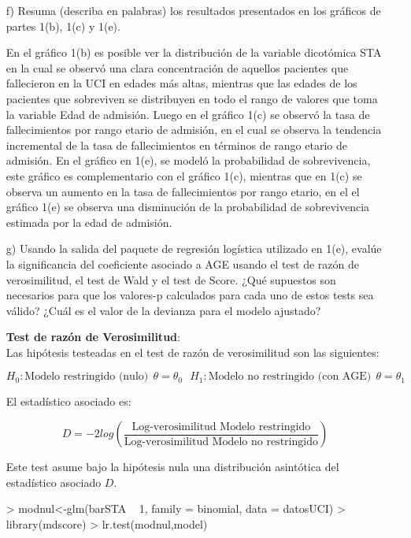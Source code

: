 \documentclass[11pt,onside]{article}
\begin{document}
\begin{itemize}
\item[f)] Resuma (describa en palabras) los resultados presentados en los gráficos de partes 1(b), 1(c) y 1(e).

En el gráfico 1(b) es posible ver la distribución de la variable dicotómica STA en la cual se observó una clara concentración de aquellos pacientes que fallecieron en la UCI en edades más altas, mientras que las edades de los pacientes que sobreviven se distribuyen en todo el rango de valores que toma la variable Edad de admisión. Luego en el gráfico 1(c) se observó la tasa de fallecimientos por rango etario de admisión, en el cual se observa la tendencia incremental de la tasa de fallecimientos en términos de rango etario de admisión. En el gráfico en 1(e), se modeló la probabilidad de sobrevivencia, este gráfico es complementario con el gráfico 1(c), mientras que en 1(c) se observa un aumento en la tasa de fallecimientos por rango etario, en el el gráfico 1(e) se observa una disminución de la probabilidad de sobrevivencia estimada por la edad de admisión.

\item[g)] Usando la salida del paquete de regresión logística utilizado en 1(e), evalúe la significancia del coeficiente asociado a AGE usando el test de razón de verosimilitud, el test de Wald y el test de Score. ¿Qué supuestos son necesarios para que los valores-p calculados para cada uno de estos tests sea válido? ¿Cuál es el valor de la devianza para el modelo ajustado?

\textbf{Test de razón de Verosimilitud}:\\
Las hipótesis testeadas en el test de razón de verosimilitud son las siguientes:

$$H_{0}: \text{Modelo restringido (nulo)} \ \  \theta=\theta_{0} \ \ \ H_{1}: \text{Modelo no restringido (con AGE)} \ \  \theta=\theta_{1}$$

El estadístico asociado es:

$$D=-2log \left(  \frac{\text{Log-verosimilitud Modelo restringido}}{\text{Log-verosimilitud Modelo no restringido}}  \right) $$

Este test asume bajo la hipótesis nula una distribución asintótica del estadístico asociado $D$. 

\begin{Schunk}
\begin{Sinput}
> modnul<-glm(barSTA ~ 1, family = binomial, data = datosUCI)
> library(mdscore)
> lr.test(modnul,model)
\end{Sinput}
\end{Schunk}
\end{itemize}
\end{document}
